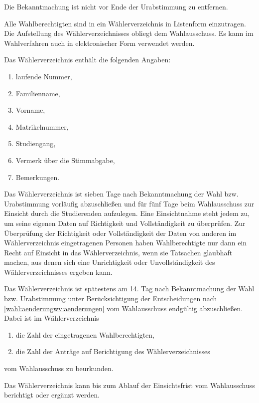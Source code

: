 Die Bekanntmachung ist nicht vor Ende der Urabstimmung zu entfernen.

\label{wahl:wählernverzeichnis}

Alle Wahlberechtigten sind in ein Wählerverzeichnis in Listenform einzutragen. Die Aufstellung des Wählerverzeichnisses obliegt dem  Wahlausschuss. Es kann im Wahlverfahren auch in elektronischer Form  verwendet werden.

Das Wählerverzeichnis enthält die folgenden Angaben:
\begin{enumerate}
\item laufende Nummer,
\item Familienname,
\item Vorname,
\item Matrikelnummer,
\item Studiengang,
\item Vermerk über die Stimmabgabe,
\item Bemerkungen.
\end{enumerate}

Das Wählerverzeichnis ist sieben Tage nach Bekanntmachung der Wahl bzw. Urabstimmung vorläufig  abzuschließen und für fünf Tage beim Wahlausschuss zur Einsicht durch die Studierenden aufzulegen. Eine Einsichtnahme steht jedem zu, um seine  eigenen Daten auf Richtigkeit und Vollständigkeit zu überprüfen. Zur Überprüfung der Richtigkeit oder Vollständigkeit der Daten von anderen im Wählerverzeichnis eingetragenen Personen haben Wahlberechtigte nur dann ein Recht auf Einsicht in das Wählerverzeichnis, wenn sie Tatsachen glaubhaft machen, aus denen sich eine Unrichtigkeit oder Unvollständigkeit des Wählerverzeichnisses ergeben kann.  \label{wahl:wählerverzeichnis:auflegung}

Das Wählerverzeichnis ist spätestens am 14. Tag nach Bekanntmachung der Wahl bzw. Urabstimmung  unter Berücksichtigung der Entscheidungen nach  \ref{wahl:aenderungwv:aenderungen} vom Wahlausschuss endgültig  abzuschließen. Dabei ist im Wählerverzeichnis
\begin{enumerate}
\item die Zahl der eingetragenen Wahlberechtigten,
\item die Zahl der Anträge auf Berichtigung des Wählerverzeichnisses
\end{enumerate}
vom Wahlausschuss zu beurkunden.

Das Wählerverzeichnis kann bis zum Ablauf der Einsichtsfrist vom Wahlausschuss berichtigt oder ergänzt werden.

